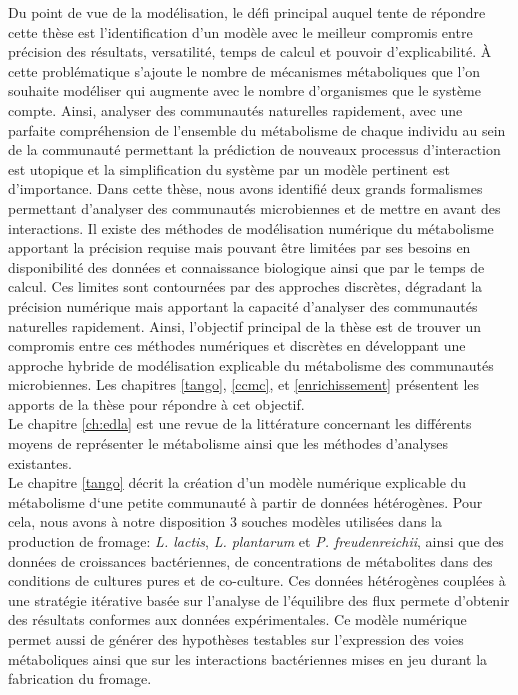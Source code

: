 Du point de vue de la modélisation, le défi principal auquel tente de répondre cette thèse est l’identification d'un modèle avec le meilleur compromis entre précision des résultats, versatilité, temps de calcul et pouvoir d’explicabilité. À cette problématique s'ajoute le nombre de mécanismes métaboliques que l'on souhaite modéliser qui augmente avec le nombre d'organismes que le système compte. Ainsi, analyser des communautés naturelles rapidement, avec une parfaite compréhension de l'ensemble du métabolisme de chaque individu au sein de la communauté permettant la prédiction de nouveaux processus d'interaction est utopique et la simplification du système par un modèle pertinent est d’importance. Dans cette thèse, nous avons identifié deux grands formalismes permettant d'analyser des communautés microbiennes et de mettre en avant des interactions. Il existe des méthodes de modélisation numérique du métabolisme apportant la précision requise mais pouvant être limitées par ses besoins en disponibilité des données et connaissance biologique ainsi que par le temps de calcul. Ces limites sont contournées par des approches discrètes, dégradant la précision numérique mais apportant la capacité d'analyser des communautés naturelles rapidement. Ainsi, l'objectif principal de la thèse est de trouver un compromis entre ces méthodes numériques et discrètes en développant une approche hybride de modélisation explicable du métabolisme des communautés microbiennes. Les chapitres \ref{tango}, \ref{ccmc}, et \ref{enrichissement} présentent les apports de la thèse pour répondre à cet objectif. \\


Le chapitre \ref{ch:edla} est une revue de la littérature concernant les différents moyens de représenter le métabolisme ainsi que les méthodes d'analyses existantes. \\


Le chapitre \ref{tango} décrit la création d’un modèle numérique explicable du métabolisme d‘une petite communauté à partir de données hétérogènes. Pour cela, nous avons à notre disposition 3 souches modèles utilisées dans la production de fromage: \textit{L. lactis}, \textit{L. plantarum} et \textit{P. freudenreichii}, ainsi que des données de croissances bactériennes, de concentrations de métabolites dans des conditions de cultures pures et de co-culture. Ces données hétérogènes couplées à une stratégie itérative basée sur l'analyse de l'équilibre des flux \citep{Orth2010} permete d'obtenir des résultats conformes aux données expérimentales. Ce modèle numérique permet aussi de générer des hypothèses testables sur l'expression des voies métaboliques ainsi que sur les interactions bactériennes mises en jeu durant la fabrication du fromage.\\


